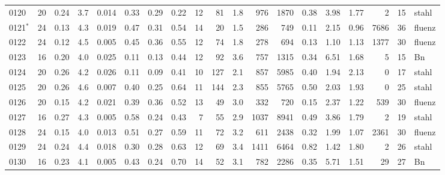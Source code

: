 {\begin{longtable}{@{}lrrrrrrrrrrrrrrrrrl@{}}
0120 & 20 & \num{0.24} & \num{3.7} & \num{0.014} & \num{0.33} & \num{0.29} & \num{0.22} & 12 & \num{81} & \num{1.8} & \num{976} & \num{1870} & \num{0.38} & \num{3.98} & \num{1.77} & \num{2} & \num{15} & stahl \\
0121$^\ast$ & 24 & \num{0.13} & \num{4.3} & \num{0.019} & \num{0.47} & \num{0.31} & \num{0.54} & 14 & \num{20} & \num{1.5} & \num{286} & \num{749} & \num{0.11} & \num{2.15} & \num{0.96} & \num{7686} & \num{36} & fluenz \\
0122 & 24 & \num{0.12} & \num{4.5} & \num{0.005} & \num{0.45} & \num{0.36} & \num{0.55} & 12 & \num{74} & \num{1.8} & \num{278} & \num{694} & \num{0.13} & \num{1.10} & \num{1.13} & \num{1377} & \num{30} & fluenz \\
0123 & 16 & \num{0.20} & \num{4.0} & \num{0.025} & \num{0.11} & \num{0.13} & \num{0.44} & 12 & \num{92} & \num{3.6} & \num{757} & \num{1315} & \num{0.34} & \num{6.51} & \num{1.68} & \num{5} & \num{15} & Bn \\
0124 & 20 & \num{0.26} & \num{4.2} & \num{0.026} & \num{0.11} & \num{0.09} & \num{0.41} & 10 & \num{127} & \num{2.1} & \num{857} & \num{5985} & \num{0.40} & \num{1.94} & \num{2.13} & \num{0} & \num{17} & stahl \\
0125 & 20 & \num{0.26} & \num{4.6} & \num{0.007} & \num{0.40} & \num{0.25} & \num{0.64} & 11 & \num{144} & \num{2.3} & \num{855} & \num{5765} & \num{0.50} & \num{2.03} & \num{1.93} & \num{0} & \num{25} & stahl \\
0126 & 20 & \num{0.15} & \num{4.2} & \num{0.021} & \num{0.39} & \num{0.36} & \num{0.52} & 13 & \num{49} & \num{3.0} & \num{332} & \num{720} & \num{0.15} & \num{2.37} & \num{1.22} & \num{539} & \num{30} & fluenz \\
0127 & 16 & \num{0.27} & \num{4.3} & \num{0.005} & \num{0.58} & \num{0.24} & \num{0.43} & 7 & \num{55} & \num{2.9} & \num{1037} & \num{8941} & \num{0.49} & \num{3.86} & \num{1.79} & \num{2} & \num{19} & stahl \\
0128 & 24 & \num{0.15} & \num{4.0} & \num{0.013} & \num{0.51} & \num{0.27} & \num{0.59} & 11 & \num{72} & \num{3.2} & \num{611} & \num{2438} & \num{0.32} & \num{1.99} & \num{1.07} & \num{2361} & \num{30} & fluenz \\
0129 & 24 & \num{0.24} & \num{4.4} & \num{0.018} & \num{0.30} & \num{0.28} & \num{0.63} & 12 & \num{69} & \num{3.4} & \num{1411} & \num{6464} & \num{0.82} & \num{1.42} & \num{1.80} & \num{2} & \num{26} & stahl \\
0130 & 16 & \num{0.23} & \num{4.1} & \num{0.005} & \num{0.43} & \num{0.24} & \num{0.70} & 14 & \num{52} & \num{3.1} & \num{782} & \num{2286} & \num{0.35} & \num{5.71} & \num{1.51} & \num{29} & \num{27} & Bn \\

\end{longtable}}
